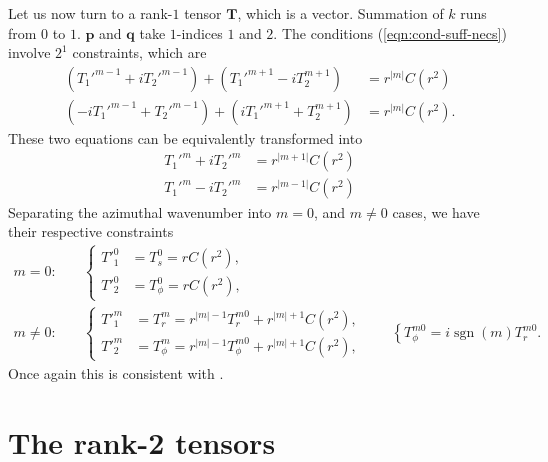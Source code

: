 \documentclass[a4paper, 11pt]{article}
\DeclareMathOperator{\sgn}{sgn}
\begin{document}
Let us now turn to a rank-$1$ tensor $\mathbf{T}$, which is a vector. Summation of $k$ runs from $0$ to $1$. $\mathbf{p}$ and $\mathbf{q}$ take $1$-indices $1$ and $2$. The conditions (\ref{eqn:cond-suff-necs}) involve $2^1$ constraints, which are
\begin{equation}
\begin{aligned}
    \left(T_1'^{m-1} + i T_2'^{m-1}\right) + \left(T_1'^{m+1} - i T_2^{m+1}\right) &= r^{|m|}C(r^2) \\ 
    \left(-iT_1'^{m-1} + T_2'^{m-1}\right) + \left(iT_1'^{m+1} + T_2^{m+1}\right) &= r^{|m|}C(r^2).
\end{aligned}
\end{equation}
These two equations can be equivalently transformed into
\[
\begin{aligned}
    T_1'^m + i T_2'^m &= r^{|m + 1|} C(r^2) \\ 
    T_1'^m - i T_2'^m &= r^{|m - 1|} C(r^2)
\end{aligned}
\]
Separating the azimuthal wavenumber into $m=0$, and $m\neq 0$ cases, we have their respective constraints
\begin{equation}
\begin{aligned}
    m=0:& \quad 
    \left\{\begin{aligned}
        T'^0_1 &= T^0_s = r C(r^2),\\
        T'^0_2 &= T^0_\phi = r C(r^2),
    \end{aligned}\right. \\
    m\neq 0:& \quad 
    \left\{\begin{aligned}
        T'^m_1 &= T^m_r = r^{|m|-1} T^{m0}_r + r^{|m|+1} C(r^2), \\ 
        T'^m_2 &= T^m_\phi = r^{|m|-1} T^{m0}_\phi + r^{|m|+1} C(r^2),
    \end{aligned}\right. \qquad \left\{T^{m0}_\phi = i\sgn(m) T^{m0}_r. \right.
\end{aligned}
\end{equation}
Once again this is consistent with \textcite{lewis_physical_1990}.


\section{The rank-2 tensors}
\end{document}
